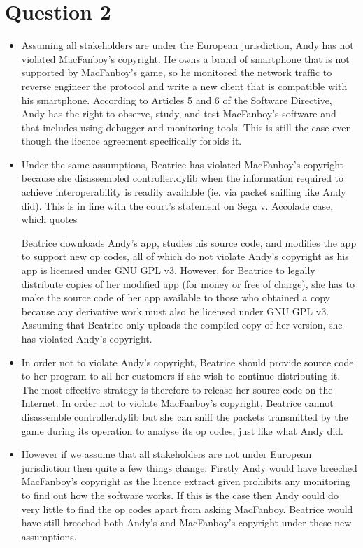 \documentclass[10pt,a4paper]{article}
\begin{document}
\section*{Question 2}
\begin{itemize}
\item Assuming all stakeholders are under the European jurisdiction, Andy has not violated MacFanboy's copyright. He owns a brand of smartphone that is not supported by MacFanboy's game, so he monitored the network traffic to reverse engineer the protocol and write a new client that is compatible with his smartphone. According to Articles 5 and 6 of the Software Directive, Andy has the right to observe, study, and test MacFanboy's software and that includes using debugger and monitoring tools. This is still the case even though the licence agreement specifically forbids it.
\item Under the same assumptions, Beatrice has violated MacFanboy's copyright because she disassembled controller.dylib when the information required to achieve interoperability is readily available (ie. via packet sniffing like Andy did). This is in line with the court's statement on Sega v. Accolade case, which quotes

\begin{displayquote}
\end{displayquote}

Beatrice downloads Andy's app, studies his source code, and modifies the app to support new op codes, all of which do not violate Andy's copyright as his app is licensed under GNU GPL v3. However, for Beatrice to legally distribute copies of her modified app (for money or free of charge), she has to make the source code of her app available to those who obtained a copy because any derivative work must also be licensed under GNU GPL v3. Assuming that Beatrice only uploads the compiled copy of her version, she has violated Andy's copyright.
\item In order not to violate Andy's copyright, Beatrice should provide source code to her program to all her customers if she wish to continue distributing it. The most effective strategy is therefore to release her source code on the Internet. In order not to violate MacFanboy's copyright, Beatrice cannot disassemble controller.dylib but she can sniff the packets transmitted by the game during its operation to analyse its op codes, just like what Andy did.
\item However if we assume that all stakeholders are not under European jurisdiction then quite a few things change. Firstly Andy would have breeched MacFanboy's copyright as the licence extract given prohibits any monitoring to find out how the software works. If this is the case then Andy could do very little to find the op codes apart from asking MacFanboy. Beatrice would have still breeched both Andy's and MacFanboy's copyright under these new assumptions.
\end{itemize}
\end{document}
